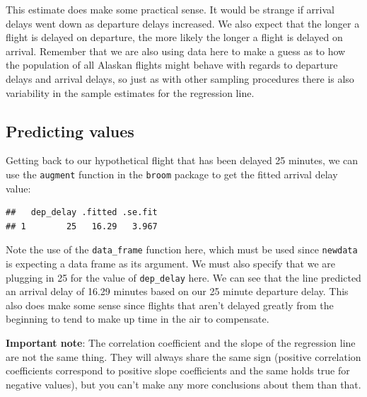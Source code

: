 \documentclass[]{tufte-book}
\newenvironment{Shaded}{\begin{snugshade}}{\end{snugshade}}
\newcommand{\KeywordTok}[1]{\textcolor[rgb]{0.13,0.29,0.53}{\textbf{{#1}}}}
\newcommand{\DataTypeTok}[1]{\textcolor[rgb]{0.13,0.29,0.53}{{#1}}}
\newcommand{\DecValTok}[1]{\textcolor[rgb]{0.00,0.00,0.81}{{#1}}}
\newcommand{\StringTok}[1]{\textcolor[rgb]{0.31,0.60,0.02}{{#1}}}
\newcommand{\NormalTok}[1]{{#1}}
\begin{document}
This estimate does make some practical sense. It would be strange if
arrival delays went down as departure delays increased. We also expect
that the longer a flight is delayed on departure, the more likely the
longer a flight is delayed on arrival. Remember that we are also using
data here to make a guess as to how the population of all Alaskan
flights might behave with regards to departure delays and arrival
delays, so just as with other sampling procedures there is also
variability in the sample estimates for the regression line.

\subsection{Predicting values}\label{predicting-values}

Getting back to our hypothetical flight that has been delayed 25
minutes, we can use the \texttt{augment} function in the \texttt{broom}
package to get the fitted arrival delay value:

\begin{Shaded}
\end{Shaded}

\begin{verbatim}
##   dep_delay .fitted .se.fit
## 1        25   16.29   3.967
\end{verbatim}

Note the use of the \texttt{data\_frame} function here, which must be
used since \texttt{newdata} is expecting a data frame as its argument.
We must also specify that we are plugging in 25 for the value of
\texttt{dep\_delay} here. We can see that the line predicted an arrival
delay of 16.29 minutes based on our 25 minute departure delay. This also
does make some sense since flights that aren't delayed greatly from the
beginning to tend to make up time in the air to compensate.

\textbf{Important note}: The correlation coefficient and the slope of
the regression line are not the same thing. They will always share the
same sign (positive correlation coefficients correspond to positive
slope coefficients and the same holds true for negative values), but you
can't make any more conclusions about them than that.
\end{document}
